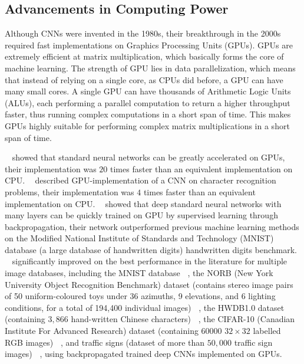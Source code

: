 \documentclass[12pt]{report}
\numberwithin{equation}{section}
\begin{document}
\subsection{Advancements in Computing Power}
Although CNNs were invented in the 1980s, their breakthrough in the 2000s required fast implementations on Graphics Processing Units (GPUs). GPUs are extremely efficient at matrix multiplication, which basically forms the core of machine learning. The strength of GPU lies in data parallelization, which means that instead of relying on a single core, as CPUs did before, a GPU can have many small cores. A single GPU can have thousands of Arithmetic Logic Units (ALUs), each performing a parallel computation to return a higher throughput faster, thus running complex computations in a short span of time. This makes GPUs highly suitable for performing complex matrix multiplications in a short span of time.

\textbf{~\cite{gpu2004}}  showed that standard neural networks can be greatly accelerated on GPUs, their implementation was $20$ times faster than an equivalent implementation on CPU. \textbf{~\cite{chellapilla:inria-00112631}} described GPU-implementation of a CNN on character recognition problems, their implementation was $4$ times faster than an equivalent implementation on CPU. \textbf{~\cite{10.1162/NECO_a_00052}} showed that deep standard neural networks with many layers can be quickly trained on GPU by supervised learning through  backpropagation, their network outperformed previous machine learning methods on the Modified National Institute of Standards and Technology (MNIST) database (a large database of handwritten digits) handwritten digits benchmark. \textbf{~\cite{Ciresan12multi-columndeep}} significantly improved on the best performance in the literature for multiple image databases, including the MNIST database \textbf{~\cite{LeCun:89}}, the NORB (New York University Object Recognition Benchmark) dataset  (contains stereo image pairs of 50 uniform-coloured toys under 36 azimuths, 9 elevations, and 6 lighting conditions, for a total of 194,400 individual images) \textbf{~\cite{10.5555/1896300.1896315}}, the HWDB1.0 dataset (containing $3,866$ hand-written Chinese characters) \textbf{~\cite{icdar2011Chinese}}, the CIFAR-10 (Canadian Institute For Advanced Research) dataset (containing $60000$ $32 \times 32$ labelled RGB images) \textbf{~\cite{krizhevsky2009learning}}, and traffic signs (dataset of more than $50,000$ traffic sign images) \textbf{~\cite{stallkamp:11}}, using backpropagated trained deep CNNs implemented on GPUs.
\end{document}
